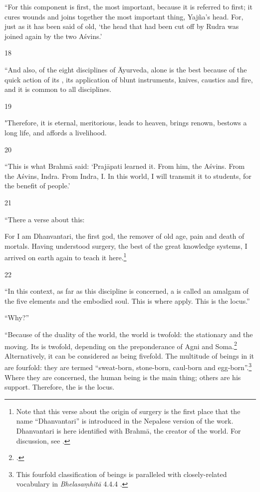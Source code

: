 \begin{translation}
“For this component is first, the most important, because it is
referred to first; it cures wounds and joins together the most
important thing, Yajña's head. For, just as it has been said of old,
`the head that had been cut off by Rudra was joined again by the two
Aśvins.'
    
    \item[18] 
    
    “And also, of the eight disciplines of Āyurveda, alone is the best
because of the quick action of its , its
application of blunt instruments, knives, caustics and fire, and
it is common to all disciplines.
    
    \item[19] 
    
"Therefore, it is eternal, meritorious, leads to heaven,
brings renown, bestows a long life, and affords a livelihood.
    
    \item[20] 
    
“This is what Brahmā said: `Prajāpati learned it. From him, the
Aśvins. From the Aśvins, Indra. From Indra, I. In this world, I will
transmit it to students, for the benefit of people.'
    
  \item[21]   
  
“There a verse about this:   
    \begin{sloka}
        For I am Dhanvantari, the first god, the remover of old age,
pain and death of mortals. Having understood surgery, the
best of the great knowledge systems, I arrived on earth again
to teach it here.\footnote{Note that this verse about the
    origin of surgery is the first place that the name
    “Dhanvantari” is introduced in the Nepalese version of the
    work. Dhanvantari is here identified with Brahmā, the creator
    of the world. For discussion, see \cite{birc-2021}.}
    \end{sloka}    
    
    
    \item[22] 
    
“In this context, as far as this discipline is concerned, a
 is called an amalgam of the five elements
and the embodied soul.  This is where  apply.
This is the locus.”
    
“Why?”
    
“Because of the duality of the world, the world is twofold: the
stationary and the moving. Its  is twofold,
depending on the preponderance of Agni and
Soma.\footcite[See][]{wuja-2004}  Alternatively, it can be considered
as being fivefold.  The multitude of beings in it are fourfold: they
are termed “sweat-born, stone-born, caul-born and
egg-born”.\footnote{This fourfold classification of beings is
    paralleled with closely-related vocabulary in  \emph{Bhelasaṃhitā}
    4.4.4 \parencites[206]{kris-2000}[81]{mook-1921}.}  Where they are
    concerned, the human being is the main thing; others are his support.
    Therefore, the  is the locus.
    

\end{translation}
